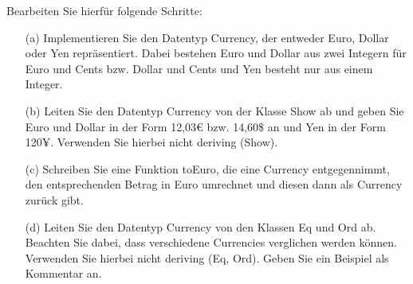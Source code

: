 Bearbeiten Sie hierfür folgende Schritte:

\begin{itemize}
  \item [(a)] Implementieren Sie den Datentyp Currency, der entweder Euro, Dollar oder Yen repräsentiert. Dabei bestehen Euro und Dollar aus zwei Integern für Euro und Cents bzw. Dollar und Cents und Yen besteht nur aus einem Integer.

  \item [(b)] Leiten Sie den Datentyp Currency von der Klasse Show ab und geben Sie Euro und Dollar in der Form 12,03€ bzw. 14,60\$ an und Yen in der Form 120¥. Verwenden Sie hierbei nicht deriving (Show).

  \item [(c)] Schreiben Sie eine Funktion toEuro, die eine Currency entgegennimmt, den entsprechenden Betrag in Euro umrechnet und diesen dann als Currency zurück gibt.

  \item [(d)] Leiten Sie den Datentyp Currency von den Klassen Eq und Ord ab. Beachten Sie dabei, dass verschiedene Currencies verglichen werden können. Verwenden Sie hierbei nicht deriving (Eq, Ord). Geben Sie ein Beispiel als Kommentar an.
  
  \newpage

  \inputminted{Haskell}{A5_5.hs}

\end{itemize}

